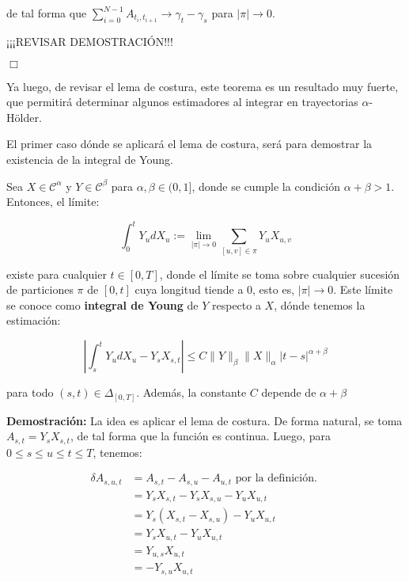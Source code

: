 de tal forma que $\sum_{i = 0}^{N - 1} A_{t_i, t_{i+1}} \rightarrow \gamma_t - \gamma_s$ para $\lvert \pi \rvert \rightarrow 0$.

¡¡¡REVISAR DEMOSTRACIÓN!!!

\begin{flushright}
	$\Box$
\end{flushright}

Ya luego, de revisar el lema de costura, este teorema es un resultado muy fuerte, que permitirá determinar algunos estimadores al integrar en trayectorias $\alpha$-Hölder.

El primer caso dónde se aplicará el lema de costura, será para demostrar la existencia de la integral de Young.

\begin{prop}
	Sea $X \in \mathcal{C}^{\alpha}$ y $Y \in \mathcal{C}^{\beta}$ para $\alpha, \beta \in (0, 1]$, donde se cumple la condición $\alpha + \beta > 1$. Entonces, el límite:

	\[
		\int^t_0 Y_u dX_u := \lim_{ \lvert \pi \rvert \rightarrow 0} \sum_{ [u, v] \in \pi  } Y_u X_{u,v}
	\]

	existe para cualquier $t \in [0,T]$, donde el límite se toma sobre cualquier sucesión de particiones $\pi$ de $[0,t]$ cuya longitud tiende a 0, esto es, $\lvert \pi \rvert \rightarrow 0$. Este límite se conoce como \textbf{integral de Young} de $Y$ respecto a $X$, dónde tenemos la estimación:

	\[
		\left\lvert \int_s^t Y_u dX_u - Y_s X_{s,t} \right\rvert \leq C \lVert Y \rVert_{\beta} \lVert X \rVert_{\alpha} \lvert t - s \rvert^{\alpha + \beta}
	\]

	para todo $(s,t) \in \Delta_{[0,T]}$. Además, la constante $C$ depende de $\alpha + \beta$

\end{prop}

\textbf{Demostración:} La idea es aplicar el lema de costura. De forma natural, se toma $A_{s,t} = Y_s X_{s,t}$, de tal forma que la función es continua. Luego, para $0 \leq s \leq u \leq t \leq T$, tenemos:

\begin{align*}
	\delta A_{s,u,t} &= A_{s,t} - A_{s,u} - A_{u,t} \text{ por la definición. } \\
	&= Y_s X_{s,t} - Y_s X_{s,u} - Y_u X_{u,t} \\
	&= Y_s ( X_{s,t} - X_{s,u}  ) - Y_u X_{u,t} \\
	&= Y_s X_{u,t} - Y_u X_{u,t} \\
	&= Y_{u,s} X_{u,t} \\
	&= -Y_{s,u} X_{u,t}
\end{align*}

